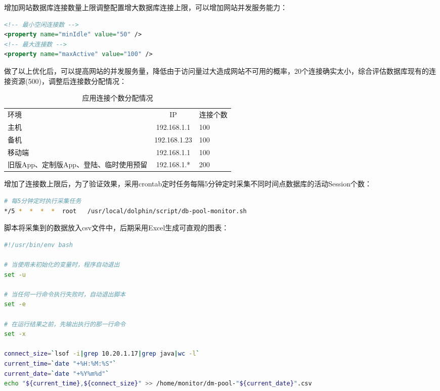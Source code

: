 \documentclass[8pt]{book}
\makeatletter
\numberwithin{dummy}{section}
\theoremstyle{ocrenumbox}
\theoremstyle{blacknumex}
\theoremstyle{blacknumbox}
\theoremstyle{ocrenum}
\renewcommand\paragraph{\@startsection{paragraph}{4}{\z@}
	{-2ex \@plus-.2ex \@minus .2ex}
	{.1ex}
	{\normalfont\small\sffamily\bfseries}}
\makeatother
\begin{document}
\paragraph{增加网站数据库连接数量上限}调整配置增大数据库连接上限，可以增加网站并发服务能力：

\begin{lstlisting}[language=XML]
<!-- 最小空闲连接数 -->
<property name="minIdle" value="50" />
<!-- 最大连接数 -->
<property name="maxActive" value="100" />
\end{lstlisting}

做了以上优化后，可以提高网站的并发服务量，降低由于访问量过大造成网站不可用的概率，20个连接确实太小，综合评估数据库现有的连接资源(500)，调整后连接数分配情况：

\begin{table}[htbp]
	\caption{应用连接个数分配情况}
	\label{table:projectdirectionayinfo}
	\begin{center}
		\begin{tabular}{|p{3cm}|c|p{2cm}|}
			\hline
			\multirow{1}{*}{环境}
			& \multicolumn{1}{c|}{IP} 
			& \multicolumn{1}{c|}{连接个数}\\			
			\cline{1-3}
			主机 &  192.168.1.1  & 100 \\
			\hline
			备机 &  192.168.1.23  & 100 \\
			\hline
			移动端 &  192.168.1.1  & 100 \\
			\hline
			旧版App、定制版App、登陆、临时使用预留 &  192.168.1.*  & 200 \\
			\hline									
		\end{tabular}	
	\end{center}
\end{table}

增加了连接数上限后，为了验证效果，采用crontab定时任务每隔5分钟定时采集不同时间点数据库的活动Session个数：

\begin{lstlisting}[language=Bash]
# 每5分钟定时执行采集任务
*/5 *  *  *  *  root   /usr/local/dolphin/script/db-pool-monitor.sh
\end{lstlisting}

脚本将采集到的数据放入csv文件中，后期采用Excel生成可直观的图表：

\begin{lstlisting}[language=Bash]
#!/usr/bin/env bash

# 当使用未初始化的变量时，程序自动退出
set -u

# 当任何一行命令执行失败时，自动退出脚本
set -e

# 在运行结果之前，先输出执行的那一行命令
set -x

connect_size=`lsof -i|grep 10.20.1.17|grep java|wc -l`
current_time=`date "+%H:%M:%S"`
current_date=`date "+%Y%m%d"`
echo "${current_time},${connect_size}" >> /home/monitor/dm-pool-"${current_date}".csv
\end{lstlisting}
\end{document}

